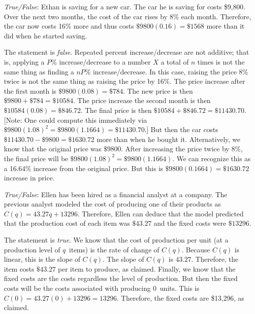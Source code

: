 \documentclass[11pt,letterpaper]{article}
\begin{document}
\thispagestyle{title}

\quizsol \textit{True/False}: Ethan is saving for a new car. The car he is saving for costs \$9,800. Over the next two months, the cost of the car rises by 8\% each month. Therefore, the car now costs 16\% more and thus costs $\$9800(0.16)= \$1568$ more than it did when he started saving. \pspace

\sol The statement is \textit{false}. Repeated percent increase/decrease are not additive; that is, applying a $P$\% increase/decrease to a number $X$ a total of $n$ times is not the same thing as finding a $nP$\% increase/decrease. In this case, raising the price 8\% twice is not the same thing as raising the price by 16\%. The price increase after the first month is $\$9800(0.08)= \$784$. The new price is then $\$9800 + \$784= \$10584$. The price increase the second month is then $\$10584(0.08)= \$846.72$. The final price is then $\$10584 + \$846.72= \$11430.70$. [Note: One could compute this immediately via $\$9800(1.08)^2= \$9800(1.1664)= \$11430.70$.] But then the car costs $\$11430.70 - \$9800= \$1630.72$ more than when he bought it. Alternatively, we know that the original price was $\$9800$. After increasing the price twice by 8\%, the final price will be $\$9800(1.08)^2= \$9800(1.1664)$. We can recognize this as a 16.64\% increase from the original price. But this is $\$9800(0.1664)= \$1630.72$ increase in price. \pvspace{1.3cm}



\quizsol \textit{True/False}: Ellen has been hired as a financial analyst at a company. The previous analyst modeled the cost of producing one of their products as $C(q)= 43.27q + 13296$. Therefore, Ellen can deduce that the model predicted that the production cost of each item was $\$43.27$ and the fixed costs were $\$13296$. \pspace

\sol The statement is \textit{true}. We know that the cost of production per unit (at a production level of $q$~items) is the rate of change of $C(q)$. Because $C(q)$ is linear, this is the slope of $C(q)$. The slope of $C(q)$ is $43.27$. Therefore, the item costs $\$43.27$ per item to produce, as claimed. Finally, we know that the fixed costs are the costs regardless the level of production. But then the fixed costs will be the costs associated with producing 0~units. This is $C(0)= 43.27(0) + 13296= 13296$. Therefore, the fixed costs are \$13,296, as claimed. \pvspace{1.3cm}
\end{document}
